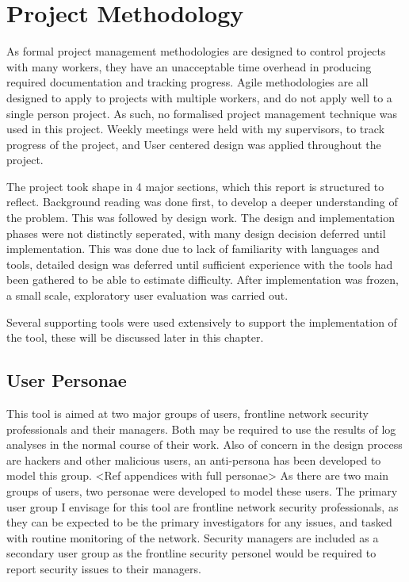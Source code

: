 \chapter{Project Methodology}\label{proj}

As formal project management methodologies are designed to control projects with many workers, they have an unacceptable time overhead in producing required documentation and tracking progress. Agile methodologies are all designed to apply to projects with multiple workers, and do not apply well to a single person project. As such, no formalised project management technique was used in this project.  
Weekly meetings were held with my supervisors, to track progress of the project, and User centered design was applied throughout the project. 

The project took shape in 4 major sections, which this report is structured to reflect. Background reading was done first, to develop a deeper understanding of the problem. This was followed by design work. The design and implementation phases were not distinctly seperated, with many design decision deferred until implementation. This was done due to lack of familiarity with languages and tools, detailed design was deferred until sufficient experience with the tools had been gathered to be able to estimate difficulty. After implementation was frozen, a small scale, exploratory user evaluation was carried out.

Several supporting tools were used extensively to support the implementation of the tool, these will be discussed later in this chapter. 

\section{User Personae}

This tool is aimed at two major groups of users, frontline network security professionals and their managers.
Both may be required to use the results of log analyses in the normal course of their work. Also of concern in the design process are hackers and other malicious users, an anti-persona has been developed to model this group. <Ref appendices with full personae> As there are two main groups of users, two personae were developed to model these users. 
The primary user group I envisage for this tool are frontline network security professionals, as they can be expected to be the primary investigators for any issues, and tasked with routine monitoring of the network.
Security managers are included as a secondary user group as the frontline security personel would be required to report security issues to their managers.

